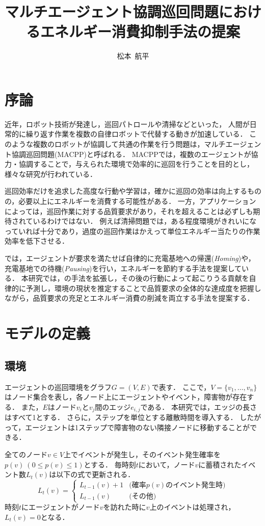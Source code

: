 \documentclass[11pt,a4j,twocolumn]{jarticle}
\title{マルチエージェント協調巡回問題におけるエネルギー消費抑制手法の提案}
\author{松本~航平}
\begin{document}
\maketitle
\section{序論}
近年，ロボット技術が発達し，巡回パトロールや清掃などといった，
人間が日常的に繰り返す作業を複数の自律ロボットで代替する動きが加速している．
このような複数のロボットが協調して共通の作業を行う問題は，マルチエージェント協調巡回問題(MACPP)と呼ばれる．
MACPPでは，複数のエージェントが協力・協調することで，与えられた環境で効率的に巡回を行うことを目的とし，様々な研究が行われている\cite{Yoneda2013,Wu2019}．
\par

巡回効率だけを追求した高度な行動や学習は，確かに巡回の効率は向上するものの，必要以上にエネルギーを消費する可能性がある．
一方，アプリケーションによっては，巡回作業に対する品質要求があり，それを超えることは必ずしも期待されているわけではない．
例えば清掃問題では，ある程度環境がきれいになっていれば十分であり，過度の巡回作業はかえって単位エネルギー当たりの作業効率を低下させる．
\par

\cite{Wu2019}では，エージェントが要求を満たせば自律的に充電基地への帰還({\em Homing})や，充電基地での待機({\em Pausing})を行い，エネルギーを節約する手法を提案している．
本研究では，\cite{Wu2019}の手法を拡張し，その後の行動によって起こりうる貢献を自律的に予測し，環境の現状を推定することで品質要求の全体的な達成度を把握しながら，品質要求の充足とエネルギー消費の削減を両立する手法を提案する．

\section{モデルの定義}
\subsection{環境}
エージェントの巡回環境をグラフ$G = (V,E)$で表す．
ここで，$V = \{v_1, \dots, v_n \}$はノード集合を表し，各ノード上にエージェントやイベント，障害物が存在する．
また，$E$はノード$v_i$と$v_j$間のエッジ$e_{i,j}$である．
本研究では，エッジの長さはすべて1とする．
さらに，ステップを単位とする離散時間を導入する．
したがって，エージェントは1ステップで障害物のない隣接ノードに移動することができる．
\par

全てのノード$v\in V$上でイベントが発生し，そのイベント発生確率を$p(v)~(0\leq p(v)\leq 1)$とする．
毎時刻$t$において，ノード$v$に蓄積されたイベント数$L_t(v)$は以下の式で更新される．
%
\[
  L_t(v) = \left\{
\begin{array}{ll}
  L_{t-1}(v) + 1 & \textrm{(確率$p(v)$のイベント発生時)} \\
  L_{t-1}(v) & \textrm{(その他)}
\end{array}
\right.  
\]
%
時刻$t$にエージェントがノード$v$を訪れた時に$v$上のイベントは処理され，$L_t(v) = 0$となる．
\end{document}
